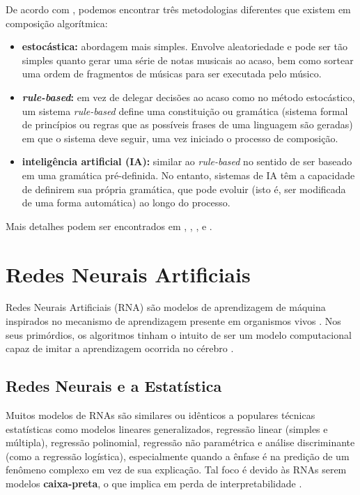 \documentclass[twoside]{automatextcc}
\begin{document}
De acordo com \citet{maurer}, podemos encontrar três metodologias diferentes que existem em composição algorítmica: 
\begin{itemize}
    \item \textbf{estocástica:} abordagem mais simples. Envolve aleatoriedade e pode ser tão simples quanto gerar uma série de notas musicais ao acaso, bem como sortear uma ordem de fragmentos de músicas para ser executada pelo músico.
    \item \textbf{\textit{rule-based}:} em vez de delegar decisões ao acaso como no método estocástico, um sistema \textit{rule-based} define uma constituição ou gramática (sistema formal de princípios ou regras que as possíveis frases de uma linguagem são geradas) em que o sistema deve seguir, uma vez iniciado o processo de composição. 
    \item \textbf{inteligência artificial (IA):} similar ao \textit{rule-based} no sentido de ser baseado em uma gramática pré-definida. No entanto, sistemas de IA têm a capacidade de definirem sua própria gramática, que pode evoluir (isto é, ser modificada de uma forma automática) ao longo do processo.
\end{itemize}
Mais detalhes podem ser encontrados em \citet{alpern1995}, \citet{maurer}, \citet{nierhaus2009}, \citet{fernandez2013} e \citet{olivan2021}.  



\section{Redes Neurais Artificiais}
Redes Neurais Artificiais (RNA) são modelos de aprendizagem de máquina inspirados no mecanismo de aprendizagem presente em organismos vivos \citep{aggarwal2018}. Nos seus primórdios, os algoritmos tinham o intuito de ser um modelo computacional capaz de imitar a aprendizagem ocorrida no cérebro \citep{goodfellow2016}.



\subsection{Redes Neurais e a Estatística}
Muitos modelos de RNAs são similares ou idênticos a populares técnicas estatísticas como modelos lineares generalizados, regressão linear (simples e múltipla), regressão polinomial, regressão não paramétrica e análise discriminante (como a regressão logística), especialmente quando a ênfase é na predição de um fenômeno complexo em vez de sua explicação. Tal foco é devido às RNAs serem modelos \textbf{caixa-preta}, o que implica em perda de interpretabilidade \citep{sarle1994, cheng1994, rojas1996}. 
\end{document}

